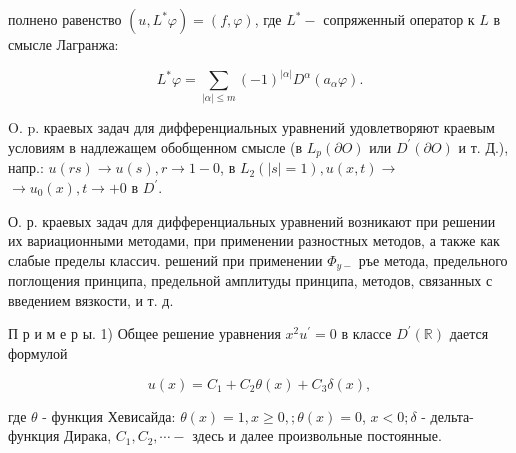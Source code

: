 \documentclass[10pt]{article}
\begin{document}
полнено равенство $\left(u, L^{*} \varphi\right)=(f, \varphi)$, где $L^{*}-$ сопряженный оператор к $L$ в смысле Лагранжа:



\[

L^{*} \varphi=\sum_{|\alpha| \leqslant m}(-1)^{|\alpha|} D^{\alpha}\left(a_{\alpha} \varphi\right) .

\]



O. p. краевых задач для дифференциальных уравнений удовлетворяют краевым условиям в надлежащем обобщенном смысле (в $L_{p}(\partial O)$ или $D^{\prime}(\partial O)$ и т. Д.), напр.: $u(r s) \rightarrow u(s), r \rightarrow 1-0$, в $L_{2}(|s|=1), u(x, t) \rightarrow$ $\rightarrow u_{0}(x), t \rightarrow+0$ в $D^{\prime}$.



О. р. краевых задач для дифференциальных уравнений возникают при решении их вариационными методами, при применении разностных методов, а также как слабые пределы классич. решений при применении $\Phi_{y-}$ ръе метода, предельного поглощения принципа, предельной амплитуды принципа, методов, связанных с введением вязкости, и т. д.



П р и м е р ы. 1) Общее решение уравнения $x^{2} u^{\prime}=0$ в классе $D^{\prime}(\mathbb{R})$ дается формулой



\[

u(x)=C_{1}+C_{2} \theta(x)+C_{3} \delta(x),

\]



где $\theta$ - функция Хевисайда: $\theta(x)=1, x \geqslant 0, ; \theta(x)=0$, $x<0 ; \delta$ - дельта-функция Дирака, $C_{1}, C_{2}, \cdots-$ здесь и далее произвольные постоянные.
\end{document}

